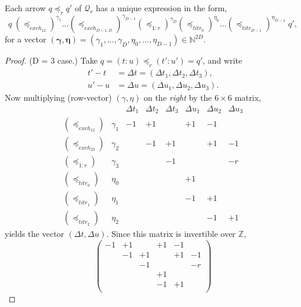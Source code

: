 \documentclass{article}
\newcommand{\N}{\mathbb{N}}
\newcommand{\Q}{\ensuremath{\mathcal{Q}}}
\begin{document}
\begin{thm}
  Each arrow $q \preceq_r q'$ of $\Q_r$ has a unique expression in the form,
  \begin{equation}
  q\;(\preceq_{exch_{12}})^{\gamma_1} ... (\preceq_{exch_{D-1,D}})^{\gamma_{D-1}} (\preceq_{1:r})^{\gamma_D} (\preceq_{titr_0})^{\eta_0} ... (\preceq_{titr_{D-1}})^{\eta_{D-1}} \;q', \label{uniqely}
  \end{equation}
  for a vector $(\mathbf{\gamma},\mathbf{\eta}) = (\gamma_1, ..., \gamma_D, \eta_0, ..., \eta_{D-1}) \in \N^{2D}$.
\end{thm}
\begin{proof}
  (D = 3 case.)  Take $q = (t\!:\!u) \preceq_r (t'\!:\!u') = q'$, and write
  \begin{equation}
    \begin{aligned}
      t'-t &= \Delta t = (\Delta t_1, \Delta t_2, \Delta t_3), \\
      u'-u &= \Delta u = (\Delta u_1, \Delta u_2, \Delta u_3).
    \end{aligned}    
  \end{equation}
  Now multiplying (row-vector) $(\gamma,\eta)$ on the {\em right} by the $6\times 6$ matrix,
  $$
  \begin{array}{crcccccc}
    & & \Delta t_1 & \Delta t_2 & \Delta t_3 & \Delta u_1 & \Delta u_2 & \Delta u_3 \\
    (\preceq_{exch_{12}}) & \gamma_1 & -1 & +1 &    & +1 & -1 &    \\
    (\preceq_{exch_{23}}) & \gamma_2 &    & -1 & +1 &    & +1 & -1 \\
    (\preceq_{1:r})     & \gamma_3 &    &    & -1 &    &    & -r \\
    (\preceq_{titr_0})   & \eta_0   &    &    &    & +1 &    &    \\
    (\preceq_{titr_1})   & \eta_1   &    &    &    & -1 & +1 &    \\
    (\preceq_{titr_2})   & \eta_2   &    &    &    &    & -1 & +1
  \end{array}
  $$
  yields the vector $(\Delta t,\Delta u)$.
  Since this matrix is invertible over $\mathbb{Z}$,
  $$
  \begin{pmatrix}
    -1 & +1 &    & +1 & -1 &    \\
       & -1 & +1 &    & +1 & -1 \\
       &    & -1 &    &    & -r \\
       &    &    & +1 &    &    \\
       &    &    & -1 & +1 &    \\

\end{pmatrix}$$
\end{proof}
\end{document}
